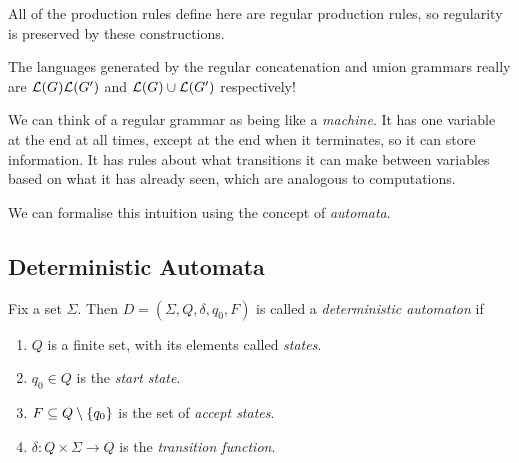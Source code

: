 \documentclass{article}
\begin{document}
\begin{note}
	All of the production rules define here are regular production rules, so regularity is preserved by these constructions.
\end{note}

\begin{corollary}
	The languages generated by the regular concatenation and union grammars really are $\mathcal{L}(G)\mathcal{L}(G')$ and $\mathcal{L}(G) \cup \mathcal{L}(G')$ respectively!
\end{corollary}

\begin{remark}[Automata]
	We can think of a regular grammar as being like a \textit{machine}. It has one variable at the end at all times, except at the end when it terminates, so it can store information. It has rules about what transitions it can make between variables based on what it has already seen, which are analogous to computations.
\end{remark}

We can formalise this intuition using the concept of \textit{automata}.

\subsection{Deterministic Automata}
\vskip 8pt

\begin{definition}
	\label{deterministic-automaton}
	Fix a set $\Sigma$. Then $D = (\Sigma, Q, \delta, q_0, F)$ is called a \textit{deterministic automaton} if
	\begin{enumerate}
		\item $Q$ is a finite set, with its elements called \textit{states}.
		\item $q_0 \in Q$ is the \textit{start state}.
		\item $F \subseteq Q \setminus \left\lbrace q_0 \right\rbrace$ is the set of \textit{accept states}.
		\item $\delta: Q \times \Sigma \to Q$ is the \textit{transition function}.
	\end{enumerate}
\end{definition}
\end{document}
